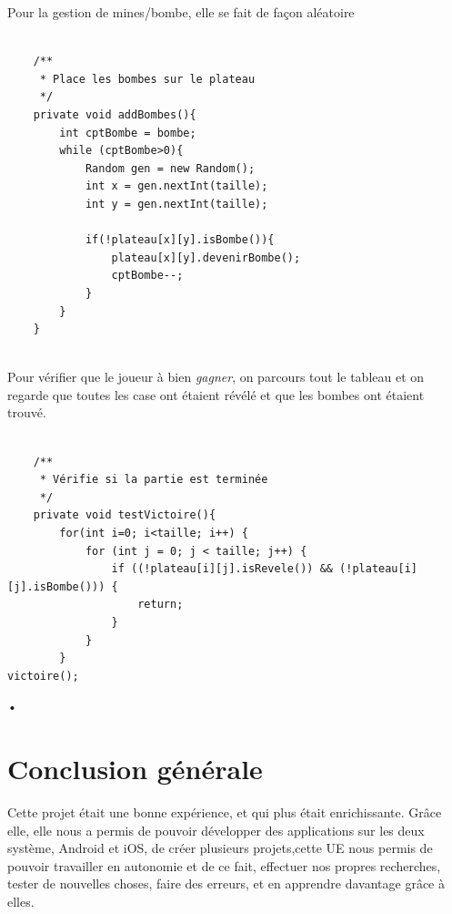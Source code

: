\documentclass{article}
\begin{document}
Pour la gestion de mines/bombe, elle se fait de façon aléatoire

\begin{verbatim}

    /**
     * Place les bombes sur le plateau
     */
    private void addBombes(){
        int cptBombe = bombe;
        while (cptBombe>0){
            Random gen = new Random();
            int x = gen.nextInt(taille);
            int y = gen.nextInt(taille);

            if(!plateau[x][y].isBombe()){
                plateau[x][y].devenirBombe();
                cptBombe--;
            }
        }
    }


\end{verbatim}

Pour vérifier que le joueur à bien \textit{gagner}, on parcours tout le tableau et on regarde que toutes les case ont étaient révélé et
que les bombes ont étaient trouvé.

\begin{verbatim}

    /**
     * Vérifie si la partie est terminée
     */
    private void testVictoire(){
        for(int i=0; i<taille; i++) {
            for (int j = 0; j < taille; j++) {
                if ((!plateau[i][j].isRevele()) && (!plateau[i][j].isBombe())) {
                    return;
                }
            }
        }
victoire();

\end{verbatim}•


\section{Conclusion générale}
	Cette projet était une bonne expérience, et qui plus était enrichissante.
Grâce elle, elle nous a permis de pouvoir développer des applications sur les deux système,
Android et iOS, de créer plusieurs projets,cette UE nous permis de pouvoir travailler en autonomie
et de ce fait, effectuer nos propres recherches, tester de nouvelles choses, faire des erreurs, et en
apprendre davantage grâce à elles.




\end{document}
